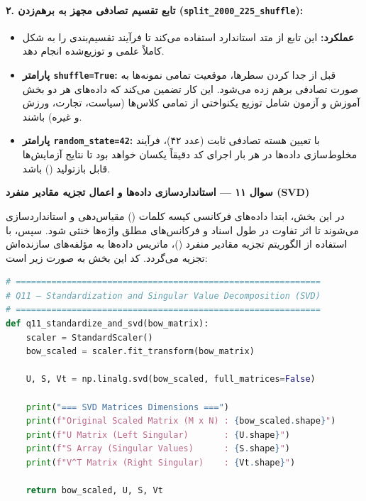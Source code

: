 \documentclass{article}
\begin{document}
    \paragraph{۲. تابع تقسیم تصادفی مجهز به برهم‌زدن (\texttt{split\_2000\_225\_shuffle}):}
    \begin{itemize}
        \item \textbf{عملکرد:} این تابع از متد استاندارد  استفاده می‌کند تا فرآیند تقسیم‌بندی را به شکل کاملاً علمی و توزیع‌شده انجام دهد.
        \item \textbf{پارامتر \texttt{shuffle=True}:} قبل از جدا کردن سطرها، موقعیت تمامی نمونه‌ها به صورت تصادفی برهم زده می‌شود. این کار تضمین می‌کند که داده‌های هر دو بخش آموزش و آزمون شامل توزیع یکنواختی از تمامی کلاس‌ها (سیاست، تجارت، ورزش و غیره) باشند.
        \item \textbf{پارامتر \texttt{random\_state=42}:} با تعیین هسته تصادفی ثابت (عدد ۴۲)، فرآیند مخلوط‌سازی داده‌ها در هر بار اجرای کد دقیقاً یکسان خواهد بود تا نتایج آزمایش‌ها قابل بازتولید () باشد.
    \end{itemize}

\noindent\textbf{سوال ۱۱ --- استانداردسازی داده‌ها و اعمال تجزیه مقادیر منفرد (SVD)}
    
  \noindent  در این بخش، ابتدا داده‌های فرکانسی کیسه کلمات () مقیاس‌دهی و استانداردسازی می‌شوند تا اثر تفاوت در طول اسناد و فرکانس‌های مطلق واژه‌ها خنثی شود. سپس، با استفاده از الگوریتم تجزیه مقادیر منفرد ()، ماتریس داده‌ها به مؤلفه‌های سازنده‌اش تجزیه می‌گردد. کد این بخش به صورت زیر است:

\begin{latin}
\begin{lstlisting}[language=Python]
# ============================================================
# Q11 — Standardization and Singular Value Decomposition (SVD)
# ============================================================
def q11_standardize_and_svd(bow_matrix):
    scaler = StandardScaler()
    bow_scaled = scaler.fit_transform(bow_matrix)
    
    U, S, Vt = np.linalg.svd(bow_scaled, full_matrices=False)
    
    print("=== SVD Matrices Dimensions ===")
    print(f"Original Scaled Matrix (M x N) : {bow_scaled.shape}")
    print(f"U Matrix (Left Singular)       : {U.shape}")
    print(f"S Array (Singular Values)      : {S.shape}")
    print(f"V^T Matrix (Right Singular)    : {Vt.shape}")
    
    return bow_scaled, U, S, Vt
\end{lstlisting}
\end{latin}
\end{document}

